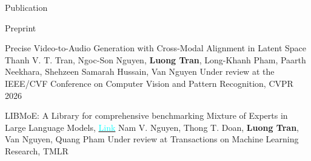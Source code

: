 \documentclass{resume} %
\begin{document}
\begin{rSection}{Publication}
    

\end{rSection}


\begin{rSection}{Preprint}

\begin{rSubsectionPaper}
    {Precise Video-to-Audio Generation with Cross-Modal Alignment in Latent Space}
    {Thanh V. T. Tran, Ngoc-Son Nguyen, \textbf{Luong Tran}, Long-Khanh Pham, Paarth Neekhara, Shehzeen Samarah Hussain, Van Nguyen}
    {Under review at the IEEE/CVF Conference on Computer Vision and Pattern Recognition, CVPR 2026}
    {}
    
\end{rSubsectionPaper}

\vspace{-0.4cm}


\begin{rSubsectionPaper}
    {LIBMoE: A Library for comprehensive benchmarking Mixture of Experts in Large Language Models, \href{https://arxiv.org/abs/2411.00918}{\textcolor{cyan}{Link}}}
    {Nam V. Nguyen, Thong T. Doan, \textbf{Luong Tran}, Van Nguyen, Quang Pham}
    {Under review at Transactions on Machine Learning Research, TMLR}
    {}
    
\end{rSubsectionPaper}

\vspace{-0.4cm}




\end{rSection}
\end{document}
